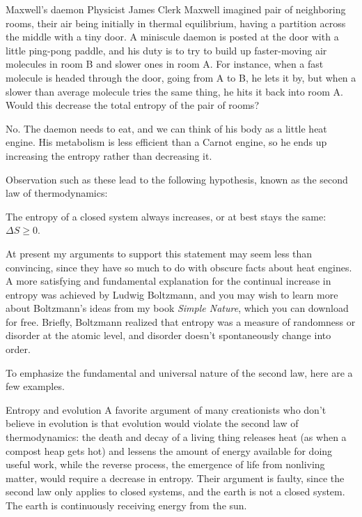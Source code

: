 \begin{eg}{Maxwell's daemon}
\egquestion
Physicist James Clerk Maxwell imagined pair of neighboring rooms, their air being initially in
thermal equilibrium, having a partition across the middle
with a tiny door. A miniscule daemon is posted at the door
with a little ping-pong paddle, and his duty is to try to
build up faster-moving air molecules in room B and slower
ones in room A. For instance, when a fast molecule is
headed through the door, going from A to B, he lets it by,
but when a slower than average molecule tries the same
thing, he hits it back into room A. Would this decrease the
total entropy of the pair of rooms?

\eganswer
No. The daemon needs to eat, and we can think of his body as
a little heat engine. His metabolism is less efficient
than a Carnot engine, so he ends up increasing the entropy
rather than decreasing it.
\end{eg}

Observation such as these lead to the following hypothesis,
known as the second law of thermodynamics:

\begin{important}
The entropy of a closed system always increases, or at best
stays the same: $\Delta S\ge0$.
\end{important}

At present my arguments to support this statement may seem
less than convincing, since they have so much to do with
obscure facts about heat engines. A more satisfying and
fundamental explanation for the continual increase in
entropy was achieved by Ludwig Boltzmann, and you may wish
to learn more about Boltzmann's ideas from my book \emph{Simple Nature}, which you
can download for free. Briefly, Boltzmann realized that
entropy was a measure of randomness or disorder at the atomic level, and
disorder doesn't spontaneously change into order.

To emphasize the fundamental and universal nature of the second
law, here are a few examples.

\begin{eg}{Entropy and evolution}\label{eg:entropy-evolution}
A favorite argument of many creationists who don't believe
in evolution is that evolution would violate the second law
of thermodynamics: the death and decay of a living thing
releases heat (as when a compost heap gets hot) and lessens
the amount of energy available for doing useful work, while
the reverse process, the emergence of life from nonliving
matter, would require a decrease in entropy. Their argument
is faulty, since the second law only applies to closed
systems, and the earth is not a closed system. The earth is
continuously receiving energy from the sun.
\end{eg}

